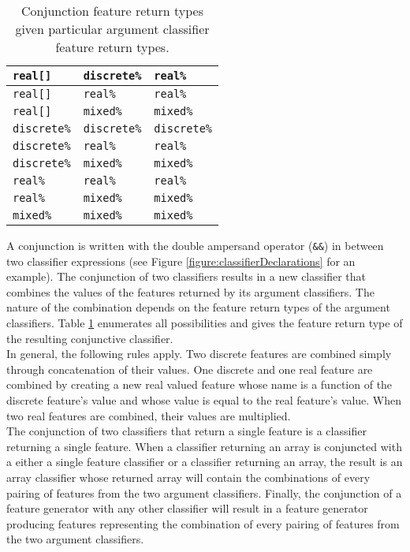 \begin{table}
\begin{center}
\begin{tabular}{|l|l|l|}
{\tt real[]}        & {\tt discrete\%}    & {\tt real\%}      \\ \hline
{\tt real[]}        & {\tt real\%}        & {\tt real\%}      \\ \hline
{\tt real[]}        & {\tt mixed\%}       & {\tt mixed\%}     \\ \hline
{\tt discrete\%}    & {\tt discrete\%}    & {\tt discrete\%}  \\ \hline
{\tt discrete\%}    & {\tt real\%}        & {\tt real\%}      \\ \hline
{\tt discrete\%}    & {\tt mixed\%}       & {\tt mixed\%}     \\ \hline
{\tt real\%}        & {\tt real\%}        & {\tt real\%}      \\ \hline
{\tt real\%}        & {\tt mixed\%}       & {\tt mixed\%}     \\ \hline
{\tt mixed\%}       & {\tt mixed\%}       & {\tt mixed\%}     \\ \hline
\end{tabular}
\caption{Conjunction feature return types given particular argument classifier
feature return types.}
\label{table:conjunctionReturnTypes}
\end{center}
\end{table}

A conjunction is written with the double ampersand operator ({\tt \&\&}) in
between two classifier expressions (see Figure
\ref{figure:classifierDeclarations} for an example).  The conjunction of two
classifiers results in a new classifier that combines the values of the
features returned by its argument classifiers.  The nature of the combination
depends on the feature return types of the argument classifiers.  Table
\ref{table:conjunctionReturnTypes} enumerates all possibilities and gives the
feature return type of the resulting conjunctive classifier. \\

In general, the following rules apply.  Two discrete features are combined
simply through concatenation of their values.  One discrete and one real
feature are combined by creating a new real valued feature whose name is a
function of the discrete feature's value and whose value is equal to the real
feature's value.  When two real features are combined, their values are
multiplied. \\

The conjunction of two classifiers that return a single feature is a
classifier returning a single feature.  When a classifier returning an array
is conjuncted with a either a single feature classifier or a classifier
returning an array, the result is an array classifier whose returned array
will contain the combinations of every pairing of features from the two
argument classifiers.  Finally, the conjunction of a feature generator with
any other classifier will result in a feature generator producing features
representing the combination of every pairing of features from the two
argument classifiers.

